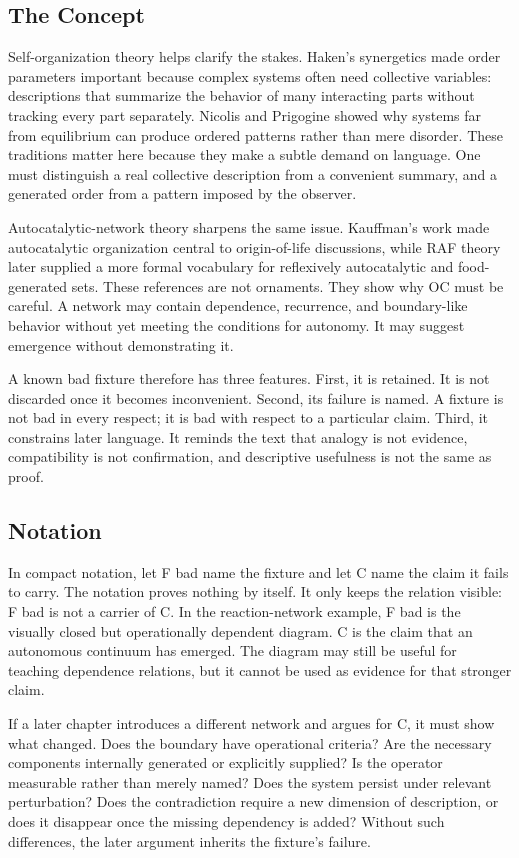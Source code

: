 \documentclass[11pt,a4paper,openany]{book}
\begin{document}
\subsection{The Concept}
Self-organization theory helps clarify the stakes. Haken's synergetics made order parameters important because complex systems often need collective variables: descriptions that summarize the behavior of many interacting parts without tracking every part separately. Nicolis and Prigogine showed why systems far from equilibrium can produce ordered patterns rather than mere disorder. These traditions matter here because they make a subtle demand on language. One must distinguish a real collective description from a convenient summary, and a generated order from a pattern imposed by the observer. \cite{haken_synergetics,nicolis_prigogine_selforg}\par
Autocatalytic-network theory sharpens the same issue. Kauffman's work made autocatalytic organization central to origin-of-life discussions, while RAF theory later supplied a more formal vocabulary for reflexively autocatalytic and food-generated sets. These references are not ornaments. They show why OC must be careful. A network may contain dependence, recurrence, and boundary-like behavior without yet meeting the conditions for autonomy. It may suggest emergence without demonstrating it.\par
A known bad fixture therefore has three features. First, it is retained. It is not discarded once it becomes inconvenient. Second, its failure is named. A fixture is not bad in every respect; it is bad with respect to a particular claim. Third, it constrains later language. It reminds the text that analogy is not evidence, compatibility is not confirmation, and descriptive usefulness is not the same as proof.\par
\subsection{Notation}
In compact notation, let F bad name the fixture and let C name the claim it fails to carry. The notation proves nothing by itself. It only keeps the relation visible: F bad is not a carrier of C. In the reaction-network example, F bad is the visually closed but operationally dependent diagram. C is the claim that an autonomous continuum has emerged. The diagram may still be useful for teaching dependence relations, but it cannot be used as evidence for that stronger claim. \cite{haken_synergetics,nicolis_prigogine_selforg}\par
If a later chapter introduces a different network and argues for C, it must show what changed. Does the boundary have operational criteria? Are the necessary components internally generated or explicitly supplied? Is the operator measurable rather than merely named? Does the system persist under relevant perturbation? Does the contradiction require a new dimension of description, or does it disappear once the missing dependency is added? Without such differences, the later argument inherits the fixture's failure.\par
\end{document}
